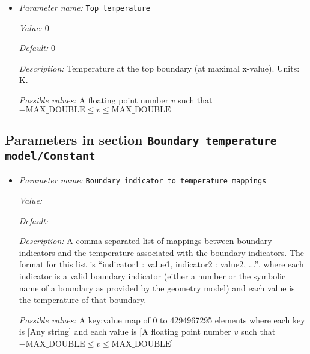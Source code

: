 \begin{itemize}
{\it Description:} Temperature at the additional right lithosphere boundary (specified by user in Geometry Model). Units: K.


{\it Possible values:} A floating point number $v$ such that $-\text{MAX\_DOUBLE} \leq v \leq \text{MAX\_DOUBLE}$
\item {\it Parameter name:} {\tt Top temperature}
\label{parameters:Boundary temperature model/Box with lithosphere boundary indicators/Top temperature}
\label{parameters:Boundary_20temperature_20model/Box_20with_20lithosphere_20boundary_20indicators/Top_20temperature}


{\it Value:} 0


{\it Default:} 0


{\it Description:} Temperature at the top boundary (at maximal x-value). Units: K.


{\it Possible values:} A floating point number $v$ such that $-\text{MAX\_DOUBLE} \leq v \leq \text{MAX\_DOUBLE}$
\end{itemize}

\subsection{Parameters in section \tt Boundary temperature model/Constant}
\label{parameters:Boundary_20temperature_20model/Constant}

\begin{itemize}
\item {\it Parameter name:} {\tt Boundary indicator to temperature mappings}
\label{parameters:Boundary temperature model/Constant/Boundary indicator to temperature mappings}
\label{parameters:Boundary_20temperature_20model/Constant/Boundary_20indicator_20to_20temperature_20mappings}


{\it Value:} 


{\it Default:} 


{\it Description:} A comma separated list of mappings between boundary indicators and the temperature associated with the boundary indicators. The format for this list is ``indicator1 : value1, indicator2 : value2, ...'', where each indicator is a valid boundary indicator (either a number or the symbolic name of a boundary as provided by the geometry model) and each value is the temperature of that boundary.


{\it Possible values:} A key:value map of 0 to 4294967295 elements  where each key is [Any string] and each value is [A floating point number $v$ such that $-\text{MAX\_DOUBLE} \leq v \leq \text{MAX\_DOUBLE}$]
\end{itemize}

